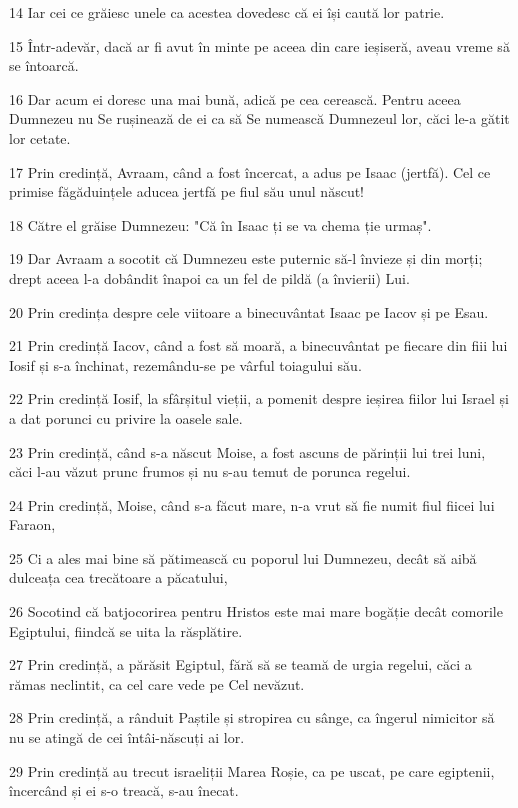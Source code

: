 \par 14 Iar cei ce grăiesc unele ca acestea dovedesc că ei își caută lor patrie.
\par 15 Într-adevăr, dacă ar fi avut în minte pe aceea din care ieșiseră, aveau vreme să se întoarcă.
\par 16 Dar acum ei doresc una mai bună, adică pe cea cerească. Pentru aceea Dumnezeu nu Se rușinează de ei ca să Se numească Dumnezeul lor, căci le-a gătit lor cetate.
\par 17 Prin credință, Avraam, când a fost încercat, a adus pe Isaac (jertfă). Cel ce primise făgăduințele aducea jertfă pe fiul său unul născut!
\par 18 Către el grăise Dumnezeu: "Că în Isaac ți se va chema ție urmaș".
\par 19 Dar Avraam a socotit că Dumnezeu este puternic să-l învieze și din morți; drept aceea l-a dobândit înapoi ca un fel de pildă (a învierii) Lui.
\par 20 Prin credința despre cele viitoare a binecuvântat Isaac pe Iacov și pe Esau.
\par 21 Prin credință Iacov, când a fost să moară, a binecuvântat pe fiecare din fiii lui Iosif și s-a închinat, rezemându-se pe vârful toiagului său.
\par 22 Prin credință Iosif, la sfârșitul vieții, a pomenit despre ieșirea fiilor lui Israel și a dat porunci cu privire la oasele sale.
\par 23 Prin credință, când s-a născut Moise, a fost ascuns de părinții lui trei luni, căci l-au văzut prunc frumos și nu s-au temut de porunca regelui.
\par 24 Prin credință, Moise, când s-a făcut mare, n-a vrut să fie numit fiul fiicei lui Faraon,
\par 25 Ci a ales mai bine să pătimească cu poporul lui Dumnezeu, decât să aibă dulceața cea trecătoare a păcatului,
\par 26 Socotind că batjocorirea pentru Hristos este mai mare bogăție decât comorile Egiptului, fiindcă se uita la răsplătire.
\par 27 Prin credință, a părăsit Egiptul, fără să se teamă de urgia regelui, căci a rămas neclintit, ca cel care vede pe Cel nevăzut.
\par 28 Prin credință, a rânduit Paștile și stropirea cu sânge, ca îngerul nimicitor să nu se atingă de cei întâi-născuți ai lor.
\par 29 Prin credință au trecut israeliții Marea Roșie, ca pe uscat, pe care egiptenii, încercând și ei s-o treacă, s-au înecat.
